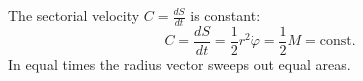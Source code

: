 The sectorial velocity $C = \frac{dS}{dt}$ is constant:
$$C = \frac{dS}{dt} = \frac{1}{2} r^2 \dot{\varphi} = \frac{1}{2} M = \text{const}.$$
In equal times the radius vector sweeps out equal areas.
